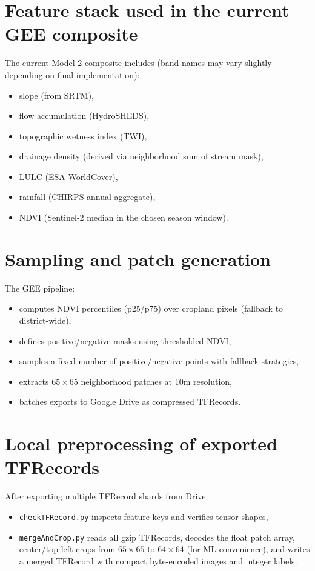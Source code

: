 \documentclass[12pt,a4paper]{report}
\begin{document}
\section{Feature stack used in the current GEE composite}
The current Model 2 composite includes (band names may vary slightly depending on final implementation):
\begin{itemize}
  \item slope (from SRTM),
  \item flow accumulation (HydroSHEDS),
  \item topographic wetness index (TWI),
  \item drainage density (derived via neighborhood sum of stream mask),
  \item LULC (ESA WorldCover),
  \item rainfall (CHIRPS annual aggregate),
  \item NDVI (Sentinel-2 median in the chosen season window).
\end{itemize}

\section{Sampling and patch generation}
The GEE pipeline:
\begin{itemize}
  \item computes NDVI percentiles (p25/p75) over cropland pixels (fallback to district-wide),
  \item defines positive/negative masks using thresholded NDVI,
  \item samples a fixed number of positive/negative points with fallback strategies,
  \item extracts $65\times 65$ neighborhood patches at 10m resolution,
  \item batches exports to Google Drive as compressed TFRecords.
\end{itemize}

\section{Local preprocessing of exported TFRecords}
After exporting multiple TFRecord shards from Drive:
\begin{itemize}
  \item \texttt{checkTFRecord.py} inspects feature keys and verifies tensor shapes,
  \item \texttt{mergeAndCrop.py} reads all gzip TFRecords, decodes the float patch array, center/top-left crops from $65\times 65$ to $64\times 64$ (for ML convenience), and writes a merged TFRecord with compact byte-encoded images and integer labels.
\end{itemize}
\end{document}
